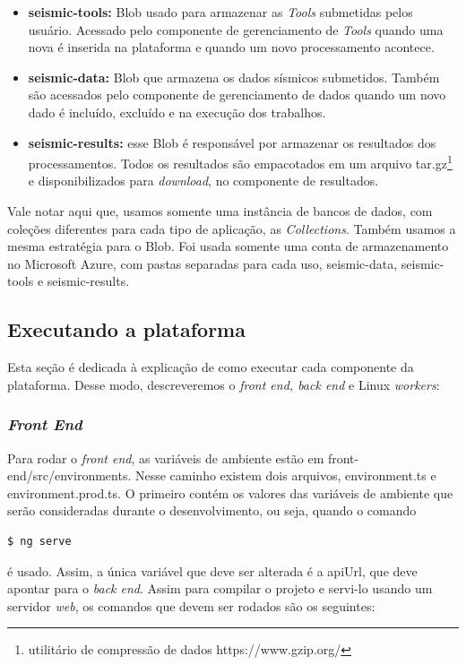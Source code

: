 \documentclass[11pt,twoside]{article}
\begin{document}
\begin{itemize}
  \item \textbf{seismic-tools:} Blob usado para armazenar as \emph{Tools} submetidas pelos usuário. Acessado pelo componente de gerenciamento de \emph{Tools} quando uma nova é inserida na plataforma 
  e quando um novo processamento acontece.
  \item \textbf{seismic-data:} Blob que armazena os dados sísmicos submetidos. Também são acessados pelo componente de gerenciamento de dados quando um novo dado é incluído, excluído e na execução dos 
  trabalhos.
  \item \textbf{seismic-results:} esse Blob é responsável por armazenar os resultados dos processamentos. Todos os resultados são empacotados em um arquivo tar.gz\footnote{ utilitário de compressão de dados https://www.gzip.org/} e disponibilizados para \emph{download}, 
  no componente de resultados.
\end{itemize}

Vale notar aqui que, usamos somente uma instância de bancos de dados, com coleções diferentes para cada tipo de aplicação, as \emph{Collections}. Também usamos a mesma estratégia para o Blob. Foi usada somente 
uma conta de armazenamento no Microsoft Azure, com pastas separadas para cada uso, seismic-data, seismic-tools e seismic-results. 

\subsection{Executando a plataforma}

Esta seção é dedicada à explicação de como executar cada componente da plataforma. Desse modo, descreveremos o \emph{front end, back end} e Linux \emph{workers}: 

\subsubsection{\emph{Front End}}

Para rodar o \emph{front end}, as variáveis de ambiente estão em front-end/src/environments. Nesse caminho existem dois arquivos, environment.ts e environment.prod.ts.
O primeiro contém os valores das variáveis de ambiente que serão consideradas durante o desenvolvimento, ou seja, quando o comando

\begin{lstlisting}[language=bash]
  $ ng serve 
\end{lstlisting}

é usado. Assim, a única variável que deve ser alterada é a apiUrl, que deve apontar para o \emph{back end}. Assim para compilar o projeto e servi-lo usando um servidor \emph{web}, os comandos que 
devem ser rodados são os seguintes: 
\end{document}
